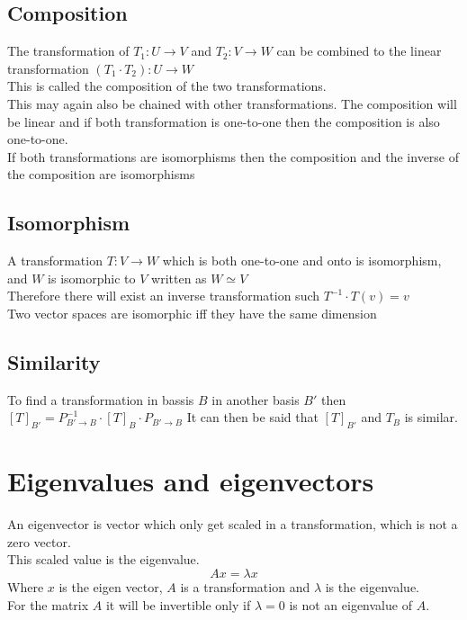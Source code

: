 \documentclass[12pt, a4paper]{article}
\begin{document}
		\subsection{Composition}
			The transformation of $T_1:U\rightarrow V$ and $T_2:V\rightarrow W$ can be combined to the linear transformation $(T_1\cdot T_2):U\rightarrow W$\\
			This is called the composition of the two transformations.\\
			This may again also be chained with other transformations.
			The composition will be linear and if both transformation is one-to-one then the composition is also one-to-one.\\
			If both transformations are isomorphisms then the composition and the inverse of the composition are isomorphisms\\
		\subsection{Isomorphism}
			A transformation $T:V\rightarrow W$ which is both one-to-one and onto is isomorphism, and $W$ is isomorphic to $V$ written as $W\simeq V$\\
			Therefore there will exist an inverse transformation such $T^{-1}\cdot T(v)=v$\\
			Two vector spaces are isomorphic iff they have the same dimension\\
		\subsection{Similarity}
			To find a transformation in bassis $B$ in another basis $B'$ then $[T]_{B'}=P^{-1}_{B'\rightarrow B}\cdot [T]_B\cdot P_{B'\rightarrow B}$
			It can then be said that $[T]_{B'}$ and $T_{B}$ is similar.
	\section{Eigenvalues and eigenvectors}
		An eigenvector is vector which only get scaled in a transformation, which is not a zero vector.\\
		This scaled value is the eigenvalue.\\
		$$Ax=\lambda x$$
		Where $x$ is the eigen vector, $A$ is a transformation and $\lambda$ is the eigenvalue.\\
		For the matrix $A$ it will be invertible only if $\lambda =0$ is not an eigenvalue of $A$.
\end{document}
